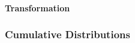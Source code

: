 \paragraph{Transformation}





\subsubsection{Cumulative Distributions}



\begin{comment}

Probability is just...really weird
https://www.youtube.com/watch?v=zczGnnM05TQ




- Probability distributions
  Discrete
  Continuous

- explain some paradoxa - make the point that probability is often counterintuitive, see:
  8 minutes of Counterintuitive Math
  https://www.youtube.com/watch?v=rYijIEl3euU
  it has not only probability related counterintuitive examples, though.


This Video Will Make You More Rational
https://www.youtube.com/watch?v=rH2wqZ58eFw
-About a probability paradoxon: Choose 1 envelope from 2. One has an mount of money x in it, the 
 other has 2*x. After selecting, you have the chance to switch the selection. Switching means that 
 you either double or halve your price with a 50/50 chance for either scenario. The expected amount 
 of money after switching is x * (2 + 1/2) / 2 = 1.25*x. ...so it seems that switching is the right 
 choice - but that seems odd. Intuitively, it shouldn't matter if we switch or not.
 
 
See also the "Monty Hall problem" (it's a different problem)
 
12 Concepts That Change How You See Probability Distributions
https://www.youtube.com/watch?v=x3XFaBYwkdA 
 
-

This unexpected proof shocked mathematicians
https://www.youtube.com/watch?v=WJGR1oc6Gxo


7 years of statistics in 25 minutes
https://www.youtube.com/watch?v=-GBppQdBF-M
-A statistic is a function of the datapoints
-some statistics are estimates (for parameters of the underlying probability distribution of the
 data)

Convolutions | Why X+Y in probability is a beautiful mess  by 3Blue1Brown
https://www.youtube.com/watch?v=IaSGqQa5O-M

\end{comment}

